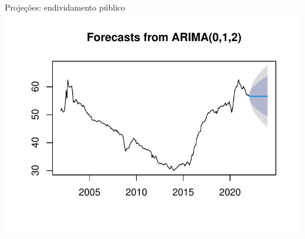 \documentclass[11pt]{beamer}
\begin{document}
\begin{frame}{Projeções: endividamento público}\centering
\includegraphics[scale=0.9]{graficos/divida_forecast_plot.pdf}
\end{frame}
\end{document}
